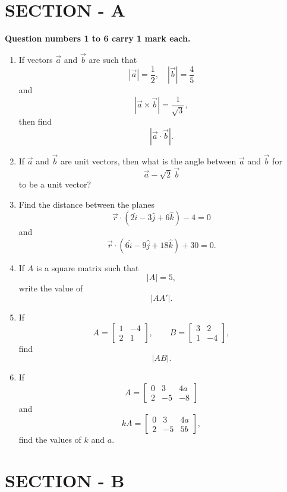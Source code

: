 \documentclass[12pt]{article}
\begin{document}
\section*{SECTION - A}

\textbf{Question numbers 1 to 6 carry 1 mark each.}

\begin{enumerate}

\item If vectors $\vec{a}$ and $\vec{b}$ are such that 
\[
|\vec{a}|=\frac{1}{2}, \quad |\vec{b}|=\frac{4}{5}
\]
and
\[
|\vec{a}\times \vec{b}|=\frac{1}{\sqrt{3}},
\]
then find
\[
|\vec{a}\cdot \vec{b}|.
\]

\item If $\vec{a}$ and $\vec{b}$ are unit vectors, then what is the angle between $\vec{a}$ and $\vec{b}$ for
\[
\vec{a}-\sqrt{2}\,\vec{b}
\]
to be a unit vector?

\item Find the distance between the planes
\[
\vec{r}\cdot(2\hat{i}-3\hat{j}+6\hat{k})-4=0
\]
and
\[
\vec{r}\cdot(6\hat{i}-9\hat{j}+18\hat{k})+30=0.
\]

\item If $A$ is a square matrix such that
\[
|A|=5,
\]
write the value of
\[
|AA'|.
\]

\item If
\[
A=
\begin{bmatrix}
1 & -4\\
2 & 1
\end{bmatrix},
\qquad
B=
\begin{bmatrix}
3 & 2\\
1 & -4
\end{bmatrix},
\]
find
\[
|AB|.
\]

\item If
\[
A=
\begin{bmatrix}
0 & 3 & 4a\\
2 & -5 & -8
\end{bmatrix}
\]
and
\[
kA=
\begin{bmatrix}
0 & 3 & 4a\\
2 & -5 & 5b
\end{bmatrix},
\]
find the values of $k$ and $a$.

\end{enumerate}

\section*{SECTION - B}
\end{document}
